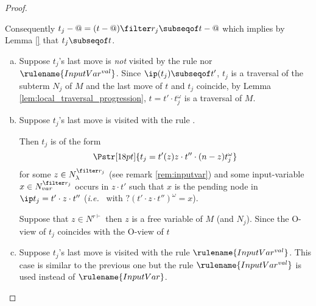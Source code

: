 \begin{proof}
\begin{enumerate}[$\bullet$]
\begin{enumerate}
\begin{enumerate}[-]
        Consequently $t_j-@ = (t-@) \filter r_j \subseqof t-@$ which implies by Lemma \ref{} that $t_j \subseqof t$.
        
    \begin{enumerate}[(a)]
    \item  Suppose $t_j$'s last move is \emph{not} visited by the rule  nor $\rulename{InputVar^{val}}$. Since $\ip( t_j) \subseqof t'$, $t_j$ is a traversal of the subterm $N_j$ of $M$ and the last move of $t$ and $t_j$ coincide,
        by Lemma \ref{lem:local_traversal_progression},
        $t = t' \cdot t_j^\omega$ is a traversal of $M$. 

    \item Suppose $t_j$'s last move is visited with the rule .

    Then $t_j$ is of the form
    $$\Pstr[18pt]{ t_j = t' (z)z \cdot t'' \cdot (n-z){t_j^\omega}}$$
for some $z \in N_\lambda^{\filter r_j}$ (see remark \ref{rem:inputvar})
and some input-variable $x \in N^{\filter r_j}_{var}$ occurs in $z\cdot t'$ such that $x$ is the pending node in $\ip t_j = t' \cdot z \cdot t''$ ({\it i.e.}~ with $?(t' \cdot z \cdot t'')^\omega = x$).

Suppose that $z\in N^{r\vdash}$ then $z$ is a free variable of $M$ (and $N_j$).
Since the O-view of $t_j$ coincides with the O-view of $t$

    \item Suppose $t_j$'s last move is visited with the rule $\rulename{InputVar^{val}}$.
    This case is similar to the previous one but the rule $\rulename{InputVar^{val}}$ is used instead
    of $\rulename{InputVar}$.
    \end{enumerate}



\end{enumerate}
\end{enumerate}
\end{enumerate}
\end{proof}
